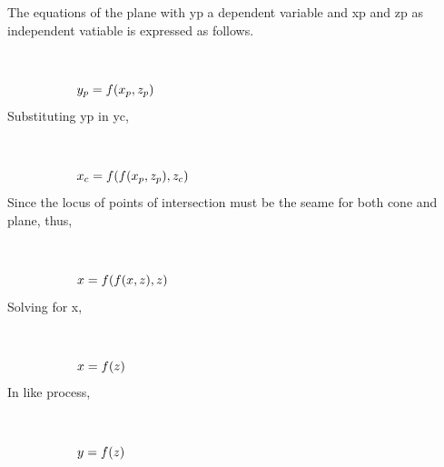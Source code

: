 \documentclass[10pt,a4paper,leqno]{article}
\begin{document}
\begin{CJK*}{UTF8}{gbsn}
\noindent The equations of the plane with yp a dependent variable and xp and zp as independent vatiable is expressed as follows.
 \par \ \par\begin{equation}
 \begin{minipage}{250pt}
                \begin{flushleft} $\displaystyle y_{p} = f{\left(x_{p},z_{p} \right)}$  \end{flushleft}
 \end{minipage}
 \end{equation}
\noindent Substituting yp in yc,
 \par \ \par\begin{equation}
 \begin{minipage}{250pt}
                \begin{flushleft} $\displaystyle x_{c} = f{\left(f{\left(x_{p},z_{p} \right)},z_{c} \right)}$  \end{flushleft}
 \end{minipage}
 \end{equation}
\noindent Since the locus of points of intersection must be the seame for both cone and plane, thus, 
 \par \ \par\begin{equation}
 \begin{minipage}{250pt}
                \begin{flushleft} $\displaystyle x = f{\left(f{\left(x,z \right)},z \right)}$  \end{flushleft}
 \end{minipage}
 \end{equation}
\noindent Solving for x,
 \par \ \par\begin{equation}
 \begin{minipage}{250pt}
                \begin{flushleft} $\displaystyle x = f{\left(z \right)}$  \end{flushleft}
 \end{minipage}
 \end{equation}
\noindent In like process,
 \par \ \par\begin{equation}
 \begin{minipage}{250pt}
                \begin{flushleft} $\displaystyle y = f{\left(z \right)}$  \end{flushleft}

\end{minipage}
\end{equation}
\end{CJK*}
\end{document}
